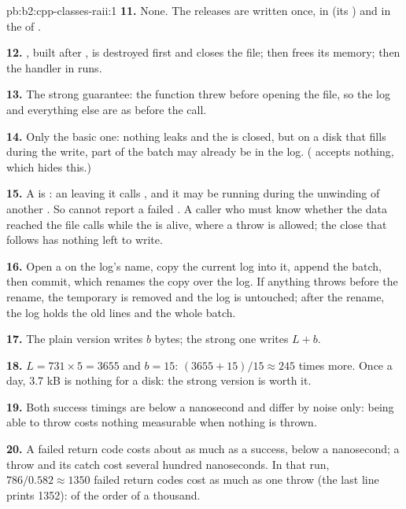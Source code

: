 \begin{solution}{pb:b2:cpp-classes-raii:1}
\textbf{11.} None. The releases are written once, in  (its ) and in the  of
.

\textbf{12.} , built after , is destroyed first and closes the file; then  frees its
memory; then the handler in  runs.

\textbf{13.} The strong guarantee: the function threw before opening the file, so the log and everything else are as
before the call.

\textbf{14.} Only the basic one: nothing leaks and the  is closed, but on a disk that fills during the
write, part of the batch may already be in the log. ( accepts nothing, which hides this.)

\textbf{15.} A  is : an  leaving it calls , and it may be
running during the unwinding of another . So  cannot report a failed . A caller
who must know whether the data reached the file calls  while the  is alive, where a throw is
allowed; the close that follows has nothing left to write.

\textbf{16.} Open a  on the log's name, copy the current log into it, append the batch, then commit,
which renames the copy over the log. If anything throws before the rename, the temporary is removed and the log is
untouched; after the rename, the log holds the old lines and the whole batch.

\textbf{17.} The plain version writes $b$ bytes; the strong one writes $L + b$.

\textbf{18.} $L = 731 \times 5 = 3655$ and $b = 15$: $(3655 + 15)/15 \approx 245$ times more. Once a day, 3.7 kB is
nothing for a disk: the strong version is worth it.

\textbf{19.} Both success timings are below a nanosecond and differ by noise only: being able to throw costs nothing
measurable when nothing is thrown.

\textbf{20.} A failed return code costs about as much as a success, below a nanosecond; a throw and its catch cost
several hundred nanoseconds. In that run, $786 / 0.582 \approx 1350$ failed return codes cost as much as one throw (the last line prints
1352): of the order of a thousand.


\end{solution}
